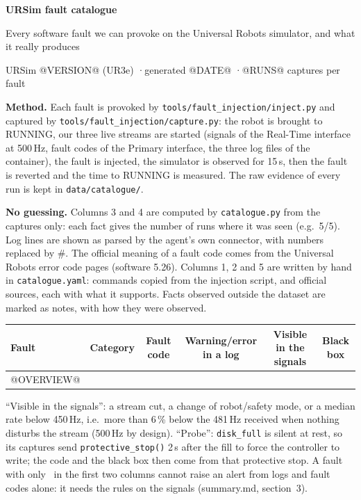 \documentclass[10pt]{article}
\newcommand{\no}{\textcolor{no}{\ding{55}}}
\begin{document}
{\LARGE\bfseries\color{accent} URSim fault catalogue}\par
\vspace{2pt}
{\large Every software fault we can provoke on the Universal Robots simulator, and what it really produces}\par
\vspace{4pt}
URSim @VERSION@ (UR3e) \quad·\quad generated @DATE@ \quad·\quad @RUNS@ captures per fault

\vspace{6pt}
\textbf{Method.} Each fault is provoked by \texttt{tools/fault\_injection/inject.py} and captured by
\texttt{tools/fault\_injection/capture.py}: the robot is brought to RUNNING, our three live streams are started
(signals of the Real-Time interface at 500\,Hz, fault codes of the Primary interface, the three log files of the
container), the fault is injected, the simulator is observed for 15\,s, then the fault is reverted and the time to
RUNNING is measured. The raw evidence of every run is kept in \texttt{data/catalogue/}.

\textbf{No guessing.} Columns 3 and 4 are computed by \texttt{catalogue.py} from the captures only: each fact
gives the number of runs where it was seen (e.g.\ 5/5). Log lines are shown as parsed by the agent's own
connector, with numbers replaced by \#. The official meaning of a fault code comes from the Universal Robots error
code pages (software 5.26). Columns 1, 2 and 5 are written by hand in \texttt{catalogue.yaml}: commands copied
from the injection script, and official sources, each with what it supports. Facts observed outside the dataset are
marked as notes, with how they were observed.

\vspace{4pt}
\begin{tabular}{@{}llcccc@{}}
\toprule
\textbf{Fault} & \textbf{Category} & \textbf{Fault code} & \textbf{Warning/error in a log} & \textbf{Visible in the signals} & \textbf{Black box} \\
\midrule
@OVERVIEW@
\bottomrule
\end{tabular}

\smallskip
{\small ``Visible in the signals'': a stream cut, a change of robot/safety mode, or a median rate below 450\,Hz,
i.e.\ more than 6\,\% below the 481\,Hz received when nothing disturbs the stream (500\,Hz by design). ``Probe'':
\texttt{disk\_full} is silent at rest, so its captures send \texttt{protective\_stop()} 2\,s after the fill to force
the controller to write; the code and the black box then come from that protective stop. A fault with only \no\ in the first two columns cannot raise an alert from logs and fault codes
alone: it needs the rules on the signals (summary.md, section~3).}
\end{document}

